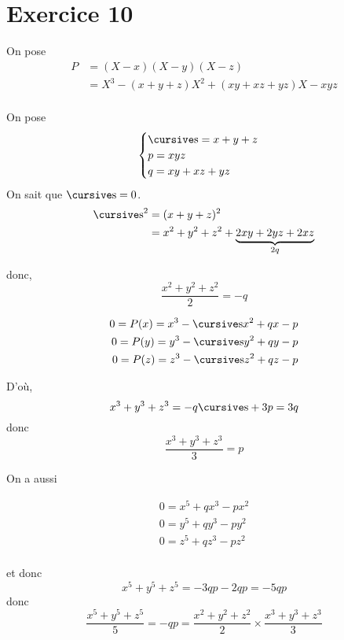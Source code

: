 \part{Exercice 10}

On pose 
\begin{align*}
	P &= (X - x)(X - y)(X - z)\\
	&= X^3 - (x + y + z)X^2 + (xy + xz + yz)X - xyz \\
\end{align*}

On pose \[
	\begin{cases}
		\s = x + y + z\\
		p = xyz\\
		q = xy + xz + yz
	\end{cases}
\]
On sait que $\s = 0$.
\begin{align*}
	\s^2 &= (x + y + z)^2\\
	&= x^2 + y^2 + z^2 + \underbrace{2xy + 2yz + 2xz}_{2q} \\
\end{align*}

donc, \[
	\frac{x^2+y^2+z^2}{2}=-q
\]

\begin{align*}
	0 = P(x) = x^3 - \s x^2 + qx - p\\
	0 = P(y) = y^3 - \s y^2 + qy - p\\
	0 = P(z) = z^3 - \s z^2 + qz - p\\
\end{align*}

D'où, \[
	x^3 + y^3 + z^3 = -q\s +  3p = 3q
\] donc \[
	\frac{x^3 + y^3 + z^3}{3}=p
\]

On a aussi

\begin{align*}
	0 = x^5 + qx^3 - px^2\\
	0 = y^5 + qy^3 - py^2\\
	0 = z^5 + qz^3 - pz^2\\
\end{align*}

et donc \[
	x^5 + y^5 + z^5 = -3qp - 2qp = -5qp
\] donc \[
	\frac{x^5 + y^5 + z^5}{5} = -qp = \frac{x^2+y^2+z^2}{2} \times \frac{x^3 + y^3 + z^3}{3}
\]
